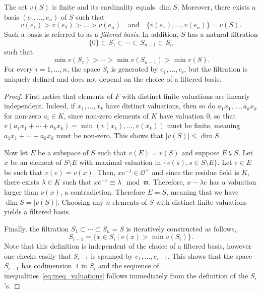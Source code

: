 \documentclass[ALCO,Unicode,ThmDefs]{cedram}
\newcommand*\OO{\mathcal{O}}
\newcommand*\m{\mathfrak m}
\renewcommand{\leq}{\leqslant}
\begin{document}
\begin{prop}\label{prop:filtered_basis}
The set $v(S)$ is finite and its cardinality equals $\dim S$. Moreover, there exists a basis $(e_1, \ldots, e_n)$ of $S$ such that
\[
v(e_1) > v(e_2) > \dots > v(e_n) \quad \text{and} \quad
\{v(e_1), \ldots, v(e_n)\}= v(S).
\]
Such a basis is referred to as
a \emph{filtered basis}. In addition, $S$ has a natural filtration
\[
\{0\} \subset S_1 \subset \cdots \subset S_{n-1} \subset S_n
\]
such that
\begin{equation}\label{eq:ineq_valuations}
\min v(S_1) > \cdots > \min v(S_{n-1}) > \min v (S).
\end{equation}
For every $i=1,\dots, n$, the space $S_i$ is generated by $e_1,\ldots ,e_i$, but the filtration is uniquely defined and does not depend on the choice of a filtered basis.
\end{prop}

\begin{proof}
First notice that elements of $F$ with distinct finite valuations are linearly independent. Indeed, if $x_1, \ldots, x_k$ have distinct valuations, then so do $a_1x_1,\ldots,a_kx_k$ for non-zero $a_i\in K$, since non-zero elements of $K$ have valuation $0$, so that $v(a_1 x_1 + \cdots + a_k x_k)=\min(v(x_1),\ldots, v(x_k))$ must be finite, meaning $a_1 x_1 + \cdots + a_k x_k$ must be non-zero. This shows that $|v(S)|\leq\dim S$.

Now let $E$ be a subspace of $S$ such that $v(E)=v(S)$ and suppose $E\subsetneqq S$. Let $x$ be an element of $S\setminus E$ with maximal valuation in $\{v(s), s\in S\setminus E\}$. Let $e\in E$ be such that $v(e)=v(x)$. Then, $xe^{-1} \in \OO^\times$ and since the residue field is $K$, there exists $\lambda \in K$ such that $xe^{-1} \equiv \lambda \mod \m$. Therefore, $x -\lambda e$ has a valuation larger than $v(x)$, a contradiction. Therefore $E=S$, meaning that we have $\dim S=|v(S)|$. Choosing any $n$ elements of $S$ with distinct finite valuations yields a filtered basis.

Finally, the filtration $S_1 \subset \cdots \subset S_n= S$ is iteratively constructed as follows,
\[
S_{i-1}=\{x \in S_i~|~v(x) > \min v(S_i)\}.
\]
Note that this definition is independent of the choice of a filtered basis, however one checks easily that $S_{i-1}$ is spanned by $e_1, \ldots, e_{i-1}$. This shows that the space $S_{i-1}$ has codimension~$1$ in $S_i$ and the sequence of inequalities~\eqref{eq:ineq_valuations} follows immediately from the definition of the $S_i$'s.
\end{proof}
\end{document}
